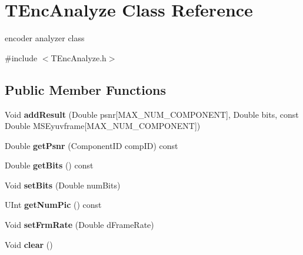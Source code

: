 \hypertarget{class_t_enc_analyze}{}\section{T\+Enc\+Analyze Class Reference}
\label{class_t_enc_analyze}


encoder analyzer class  




{\ttfamily \#include $<$T\+Enc\+Analyze.\+h$>$}

\subsection*{Public Member Functions}
\begin{DoxyCompactItemize}
\item 
\mbox{\label{class_t_enc_analyze_ab83fb538d74d0e60661799fde6d73430}} 
Void {\bfseries add\+Result} (Double psnr\mbox{[}M\+A\+X\+\_\+\+N\+U\+M\+\_\+\+C\+O\+M\+P\+O\+N\+E\+NT\mbox{]}, Double bits, const Double M\+S\+Eyuvframe\mbox{[}M\+A\+X\+\_\+\+N\+U\+M\+\_\+\+C\+O\+M\+P\+O\+N\+E\+NT\mbox{]})
\item 
\mbox{\label{class_t_enc_analyze_aacfbd03c2de63ccd6be7130953743d38}} 
Double {\bfseries get\+Psnr} (Component\+ID comp\+ID) const
\item 
\mbox{\label{class_t_enc_analyze_a3c9972e2e38d59c56df2657b98649943}} 
Double {\bfseries get\+Bits} () const
\item 
\mbox{\label{class_t_enc_analyze_a6300feafacf9d43dd964b7fc8ff6dfa0}} 
Void {\bfseries set\+Bits} (Double num\+Bits)
\item 
\mbox{\label{class_t_enc_analyze_a6b59a4e59c4ce831aff43ae4a0eafd6c}} 
U\+Int {\bfseries get\+Num\+Pic} () const
\item 
\mbox{\label{class_t_enc_analyze_a640fe9e9a3edb1fb81a4c467b8110a62}} 
Void {\bfseries set\+Frm\+Rate} (Double d\+Frame\+Rate)
\item 
\mbox{\label{class_t_enc_analyze_ab190e7ed562ba3e10ad9d80e7aba8d0d}} 
Void {\bfseries clear} ()
\item 

\end{DoxyCompactItemize}
